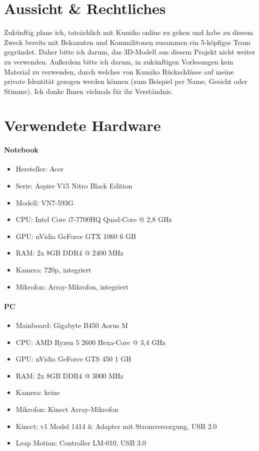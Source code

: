 \documentclass[a4paper, 12pt]{article}
\begin{document}
\section{Aussicht \& Rechtliches}
\label{sec:later}
Zukünftig plane ich, tatsächlich mit Kumiko online zu gehen
und habe zu diesem Zweck bereits mit Bekannten und Kommilitonen
zusammen ein 5-köpfiges Team gegründet.
Daher bitte ich darum,
das 3D-Modell aus diesem Projekt nicht weiter zu verwenden.
Außerdem bitte ich darum,
in zukünftigen Vorlesungen kein Material zu verwenden,
durch welches von Kumiko Rückschlüsse
auf meine private Identität gezogen werden können
(zum Beispiel per Name, Gesicht oder Stimme).
Ich danke Ihnen vielmals für ihr Verständnis.
\newpage

\section{Verwendete Hardware}
\label{sec:hardware}
\paragraph{Notebook}
\begin{itemize}
    \item Hersteller: {\ttfamily Acer}
    \item Serie: {\ttfamily Aspire V15 Nitro Black Edition}
    \item Modell: {\ttfamily VN7-593G}
    \item CPU: {\ttfamily Intel Core i7-7700HQ Quad-Core @ 2,8 GHz}
    \item GPU: {\ttfamily nVidia GeForce GTX 1060 6 GB}
    \item RAM: {\ttfamily 2x 8GB DDR4 @ 2400 MHz}
    \item Kamera: {\ttfamily 720p, integriert}
    \item Mikrofon: {\ttfamily Array-Mikrofon, integriert}
\end{itemize}
\paragraph{PC}
\begin{itemize}
    \item Mainboard: {\ttfamily Gigabyte B450 Aorus M}
    \item CPU: {\ttfamily AMD Ryzen 5 2600 Hexa-Core @ 3,4 GHz}
    \item GPU: {\ttfamily nVidia GeForce GTS 450 1 GB}
    \item RAM: {\ttfamily 2x 8GB DDR4 @ 3000 MHz}
    \item Kamera: {\ttfamily keine}
    \item Mikrofon: {\ttfamily Kinect Array-Mikrofon}
    \item Kinect: {\ttfamily v1 Model 1414} \& {\ttfamily Adapter mit Stromversorgung, USB 2.0}
    \item Leap Motion: {\ttfamily Controller LM-010, USB 3.0}
\end{itemize}
\end{document}
